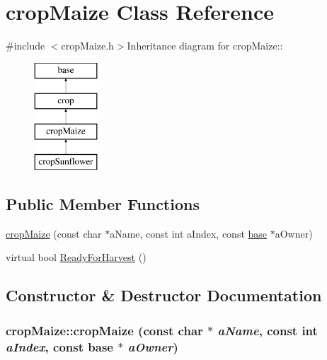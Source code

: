 \hypertarget{classcrop_maize}{
\section{cropMaize Class Reference}
\label{classcrop_maize}
}


{\ttfamily \#include $<$cropMaize.h$>$}Inheritance diagram for cropMaize::\begin{figure}[H]
\begin{center}
\leavevmode
\includegraphics[height=4cm]{classcrop_maize}
\end{center}
\end{figure}
\subsection*{Public Member Functions}
\begin{DoxyCompactItemize}
\item 
\hyperlink{classcrop_maize_a8fa02b10b947f03c4fe9490fffbd3033}{cropMaize} (const char $\ast$aName, const int aIndex, const \hyperlink{classbase}{base} $\ast$aOwner)
\item 
virtual bool \hyperlink{classcrop_maize_aad7767146cabf892674c77190b6782ef}{ReadyForHarvest} ()
\end{DoxyCompactItemize}


\subsection{Constructor \& Destructor Documentation}
\hypertarget{classcrop_maize_a8fa02b10b947f03c4fe9490fffbd3033}{
\subsubsection[{cropMaize}]{\setlength{\rightskip}{0pt plus 5cm}cropMaize::cropMaize (const char $\ast$ {\em aName}, \/  const int {\em aIndex}, \/  const {\bf base} $\ast$ {\em aOwner})}}
\label{classcrop_maize_a8fa02b10b947f03c4fe9490fffbd3033}


